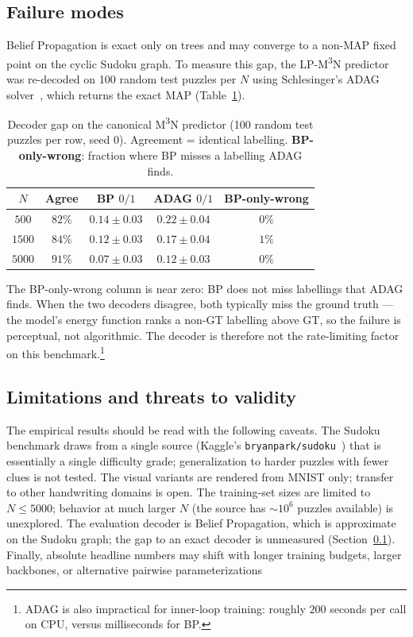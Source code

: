 \subsection{Failure modes}
\label{subsec:discussion-failure-modes}

Belief Propagation is exact only on trees and may converge to a
non-MAP fixed point on the cyclic Sudoku graph. To measure this
gap, the LP-M\textsuperscript{3}N predictor was re-decoded on
100 random test puzzles per $N$ using Schlesinger's ADAG
solver~\cite{Werner2007}, which returns the exact MAP
(Table~\ref{tab:bp-vs-adag}).

\begin{table}[htbp]
\centering
\renewcommand{\arraystretch}{1.2}
\begin{tabular}{c c c c c}
\hline
\textbf{$N$} & \textbf{Agree} & \textbf{BP $0/1$} & \textbf{ADAG $0/1$} & \textbf{BP-only-wrong} \\
\hline
$500$  & $82\%$ & $0.14 \pm 0.03$ & $0.22 \pm 0.04$ & $0\%$ \\
$1500$ & $84\%$ & $0.12 \pm 0.03$ & $0.17 \pm 0.04$ & $1\%$ \\
$5000$ & $91\%$ & $0.07 \pm 0.03$ & $0.12 \pm 0.03$ & $0\%$ \\
\hline
\end{tabular}
\caption[BP vs ADAG decoder comparison]{Decoder gap on the
canonical M\textsuperscript{3}N predictor (100 random test
puzzles per row, seed $0$). Agreement = identical labelling.
\textbf{BP-only-wrong}: fraction where BP misses a labelling
ADAG finds.}
\label{tab:bp-vs-adag}
\end{table}

The BP-only-wrong column is near zero: BP does not miss
labellings that ADAG finds. When the two decoders disagree,
both typically miss the ground truth --- the model's energy
function ranks a non-GT labelling above GT, so the failure is
perceptual, not algorithmic. The decoder is therefore not the
rate-limiting factor on this benchmark.\footnote{ADAG is also
impractical for inner-loop training: roughly $200$ seconds per
call on CPU, versus milliseconds for BP.}

\subsection{Limitations and threats to validity}
\label{subsec:discussion-limitations}

The empirical results should be read with the following
caveats. The Sudoku benchmark draws from a single source
(Kaggle's \texttt{bryanpark/sudoku}~\cite{park2018sudoku}) that
is essentially a single difficulty grade; generalization to
harder puzzles with fewer clues is not tested. The visual
variants are rendered from MNIST only; transfer to other
handwriting domains is open. The training-set sizes are limited
to $N \leq 5000$; behavior at much larger $N$ (the source has
$\sim 10^{6}$ puzzles available) is unexplored. The evaluation
decoder is Belief Propagation, which is approximate on the
Sudoku graph; the gap to an exact decoder is unmeasured
(Section~\ref{subsec:discussion-failure-modes}). Finally,
absolute headline numbers may shift with longer training
budgets, larger backbones, or alternative pairwise
parameterizations

